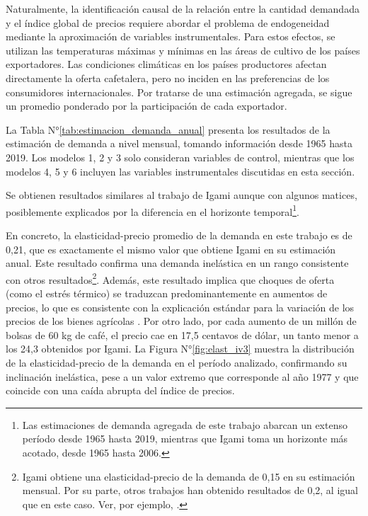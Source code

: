 Naturalmente, la identificación causal de la relación entre la cantidad demandada y el índice global de precios requiere abordar el problema de endogeneidad mediante la aproximación de variables instrumentales. Para estos efectos, se utilizan las temperaturas máximas y mínimas en las áreas de cultivo de los países exportadores. Las condiciones climáticas en los países productores afectan directamente la oferta cafetalera, pero no inciden en las preferencias de los consumidores internacionales. Por tratarse de una estimación agregada, se sigue un promedio ponderado por la participación de cada exportador.

La Tabla N°\ref{tab:estimacion_demanda_anual} presenta los resultados de la estimación de demanda a nivel mensual, tomando información desde 1965 hasta 2019. Los modelos 1, 2 y 3 solo consideran variables de control, mientras que los modelos 4, 5 y 6 incluyen las variables instrumentales discutidas en esta sección.

Se obtienen resultados similares al trabajo de Igami \citeyearpar{igami2015market} aunque con algunos matices, posiblemente explicados por la diferencia en el horizonte temporal\footnote{Las estimaciones de demanda agregada de este trabajo abarcan un extenso período desde 1965 hasta 2019, mientras que Igami toma un horizonte más acotado, desde 1965 hasta 2006.}.

En concreto, la elasticidad-precio promedio de la demanda en este trabajo es de 0,21, que es exactamente el mismo valor que obtiene Igami en su estimación anual. Este resultado confirma una demanda inelástica en un rango consistente con otros resultados\footnote{Igami obtiene una elasticidad-precio de la demanda de 0,15 en su estimación mensual. Por su parte, otros trabajos han obtenido resultados de 0,2, al igual que en este caso. Ver, por ejemplo, \cite{bates1997open}.}. Además, este resultado implica que choques de oferta (como el estrés térmico) se traduzcan predominantemente en aumentos de precios, lo que es consistente con la explicación estándar para la variación de los precios de los bienes agrícolas \citep{deaton1992behaviour, prebisch1959, singer1950}. Por otro lado, por cada aumento de un millón de bolsas de 60 kg de café, el precio cae en 17,5 centavos de dólar, un tanto menor a los 24,3 obtenidos por Igami. La Figura N°\ref{fig:elast_iv3} muestra la distribución de la elasticidad-precio de la demanda en el período analizado, confirmando su inclinación inelástica, pese a un valor extremo que corresponde al año 1977 y que coincide con una caída abrupta del índice de precios.

